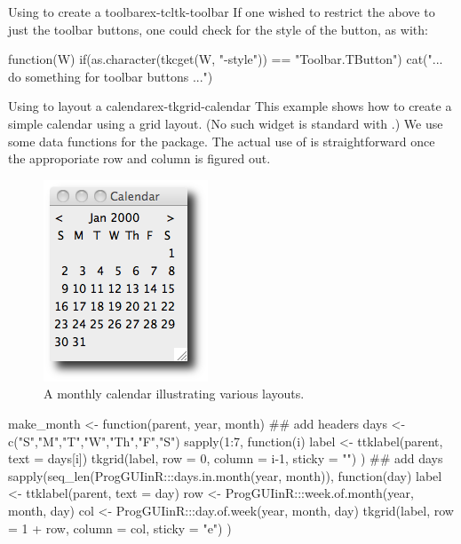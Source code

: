 \begin{example}{Using  to create a toolbar}{ex-tcltk-toolbar}
If one wished to restrict the above to just the toolbar buttons, one
could check for the style of the button, as with:

\begin{Schunk}
\begin{Sinput}
 function(W) {
   if(as.character(tkcget(W, "-style")) == "Toolbar.TButton")
     cat("... do something for toolbar buttons ...")
 }
\end{Sinput}
\end{Schunk}
\end{example}

\begin{example}{Using  to layout a calendar}{ex-tkgrid-calendar}
This example shows how to create a simple calendar using a grid
layout. (No such widget is standard with .) We use some
data functions for the  package. The actual use of
 is straightforward once the approporiate row and
column is figured out.




\begin{figure}
  \centering
  \includegraphics[width=.35\textwidth]{fig-tcltk-grid-calendar}
  \caption{A monthly calendar illustrating various layouts.}
  \label{fig:qt-gridlayout-calendar}
\end{figure}


\begin{Schunk}
\begin{Sinput}
 make_month <- function(parent, year, month) {
   ## add headers
   days <- c("S","M","T","W","Th","F","S")
   sapply(1:7, function(i) {
     label <- ttklabel(parent, text = days[i])       
     tkgrid(label, row = 0, column = i-1, sticky = "")
   })
   ## add days
   sapply(seq_len(ProgGUIinR:::days.in.month(year, month)), 
          function(day) {
            label <- ttklabel(parent, text = day)
            row <- ProgGUIinR:::week.of.month(year, month, day)
            col <- ProgGUIinR:::day.of.week(year, month, day)
            tkgrid(label, row = 1 + row, column = col, sticky = "e")
          })
 }
\end{Sinput}
\end{Schunk}


\end{example}

